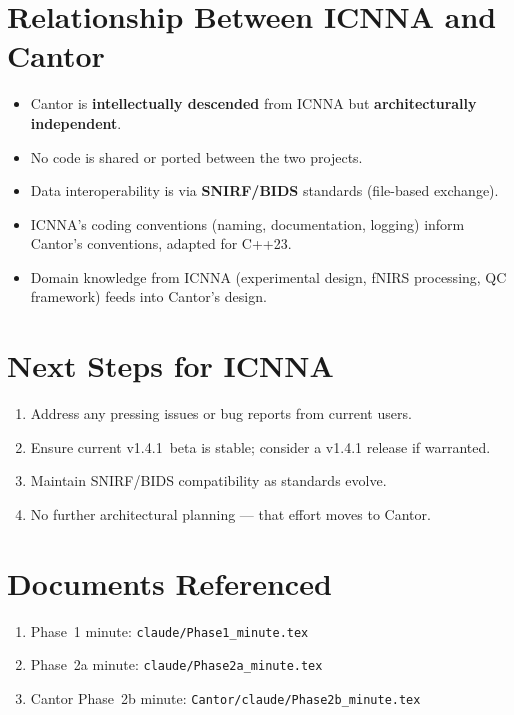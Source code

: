 \documentclass[11pt,a4paper]{article}
\begin{document}
\section{Relationship Between ICNNA and Cantor}

\begin{itemize}
    \item Cantor is \textbf{intellectually descended} from ICNNA but \textbf{architecturally independent}.
    \item No code is shared or ported between the two projects.
    \item Data interoperability is via \textbf{SNIRF/BIDS} standards (file-based exchange).
    \item ICNNA's coding conventions (naming, documentation, logging) inform Cantor's conventions, adapted for C++23.
    \item Domain knowledge from ICNNA (experimental design, fNIRS processing, QC framework) feeds into Cantor's design.
\end{itemize}

\section{Next Steps for ICNNA}

\begin{enumerate}
    \item Address any pressing issues or bug reports from current users.
    \item Ensure current v1.4.1~beta is stable; consider a v1.4.1 release if warranted.
    \item Maintain SNIRF/BIDS compatibility as standards evolve.
    \item No further architectural planning --- that effort moves to Cantor.
\end{enumerate}

\section{Documents Referenced}

\begin{enumerate}
    \item Phase~1 minute: \texttt{claude/Phase1\_minute.tex}
    \item Phase~2a minute: \texttt{claude/Phase2a\_minute.tex}
    \item Cantor Phase~2b minute: \texttt{Cantor/claude/Phase2b\_minute.tex}
\end{enumerate}
\end{document}
